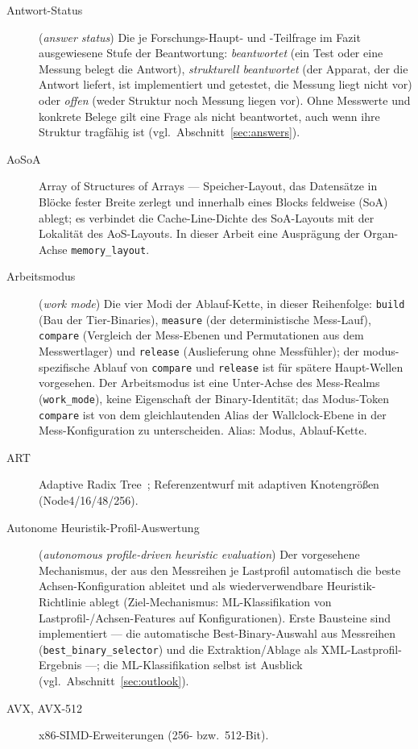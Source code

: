 \begin{description}
  \item[Antwort-Status] (\emph{answer status}) Die je Forschungs-Haupt- und -Teilfrage im Fazit
  ausgewiesene Stufe der Beantwortung: \emph{beantwortet} (ein Test oder eine Messung
  belegt die Antwort), \emph{strukturell beantwortet} (der Apparat, der die Antwort liefert, ist
  implementiert und getestet, die Messung liegt nicht vor) oder \emph{offen} (weder Struktur noch Messung
  liegen vor). Ohne Messwerte und konkrete Belege gilt eine Frage als nicht beantwortet, auch wenn
  ihre Struktur tragfähig ist (vgl.\ Abschnitt~\ref{sec:answers}).
  \item[AoSoA] Array of Structures of Arrays --- Speicher-Layout, das Datensätze in Blöcke fester
  Breite zerlegt und innerhalb eines Blocks feldweise (SoA) ablegt; es verbindet die
  Cache-Line-Dichte des SoA-Layouts mit der Lokalität des AoS-Layouts. In dieser Arbeit eine
  Ausprägung der Organ-Achse \texttt{memory\_layout}.
  \item[Arbeitsmodus] (\emph{work mode}) Die vier Modi der Ablauf-Kette, in dieser Reihenfolge:
  \texttt{build} (Bau der Tier-Binaries), \texttt{measure} (der deterministische Mess-Lauf),
  \texttt{compare} (Vergleich der Mess-Ebenen und Permutationen aus dem Messwertlager) und
  \texttt{release} (Auslieferung ohne Messfühler); der modus-spezifische Ablauf von \texttt{compare} und
  \texttt{release} ist für spätere Haupt-Wellen vorgesehen. Der Arbeitsmodus ist eine Unter-Achse des
  Mess-Realms (\texttt{work\_mode}), keine Eigenschaft der Binary-Identität; das Modus-Token
  \texttt{compare} ist von dem gleichlautenden Alias der Wallclock-Ebene in der Mess-Konfiguration
  zu unterscheiden. Alias: Modus, Ablauf-Kette.
  \item[ART] Adaptive Radix Tree~\cite{leis2013art}; Referenzentwurf mit adaptiven Knotengrößen
  (Node4/16/48/256).
  \item[Autonome Heuristik-Profil-Auswertung]
  (\emph{autonomous profile-driven heuristic evaluation}) Der vorgesehene Mechanismus, der aus den
  Messreihen je Lastprofil automatisch die beste Achsen-Konfiguration ableitet und als
  wiederverwendbare Heuristik-Richtlinie ablegt (Ziel-Mechanismus: ML-Klassifikation von
  Lastprofil-/Achsen-Features auf Konfigurationen). Erste Bausteine sind implementiert --- die
  automatische Best-Binary-Auswahl aus Messreihen (\texttt{best\_binary\_selector}) und die
  Extraktion/Ablage als XML-Lastprofil-Ergebnis ---; die ML-Klassifikation selbst ist
  Ausblick (vgl.\ Abschnitt~\ref{sec:outlook}).
  \item[AVX, AVX-512] x86-SIMD-Erweiterungen (256- bzw.\ 512-Bit).

\end{description}
